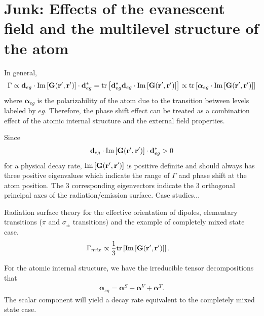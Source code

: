 \documentclass[preprint,aps,pra,onecolumn]{revtex4-1} %
\begin{document}



\section{Junk: Effects of the evanescent field and the multilevel structure of the atom}
In general, 
\begin{align}
\Gamma \propto \mathbf{d}_{eg}\cdot \mathrm{Im}\left[\mathbf{G}(\mathbf{r}',\mathbf{r}') \right]\cdot\mathbf{d}_{eg}^*=\mathrm{tr}\left[\mathbf{d}_{eg}^*\mathbf{d}_{eg}\cdot \mathrm{Im}\left[\mathbf{G}(\mathbf{r}',\mathbf{r}') \right] \right]\propto \mathrm{tr}\left[\boldsymbol{\alpha}_{eg}\cdot \mathrm{Im}\left[\mathbf{G}(\mathbf{r}',\mathbf{r}') \right] \right]
\end{align}
where $ \boldsymbol{\alpha}_{eg} $ is the polarizability of the atom due to the transition between levels labeled by $ eg $. Therefore, the phase shift effect can be treated as a combination effect of the atomic internal structure and the external field properties. 

Since 
\begin{align}
\mathbf{d}_{eg}\cdot \mathrm{Im}\left[\mathbf{G}(\mathbf{r}',\mathbf{r}') \right]\cdot\mathbf{d}_{eg}^*>0
\end{align}
for a physical decay rate, $\mathrm{Im}\left[\mathbf{G}(\mathbf{r}',\mathbf{r}')\right]$ is positive definite and should always has three positive eigenvalues which indicate the range of $ \Gamma $ and phase shift at the atom position. The 3 corresponding eigenvectors indicate the 3 orthogonal principal axes of the radiation/emission surface. Case studies...

Radiation surface theory for the effective orientation of dipoles, elementary transitions ($ \pi $ and $ \sigma_\pm $ transitions) and the example of completely mixed state case. 
\begin{align}
\Gamma_{mix} &\propto \frac{1}{3} \mathrm{tr}\left[ \mathrm{Im}\left[\mathbf{G}(\mathbf{r}',\mathbf{r}')\right] \right].
\end{align}

For the atomic internal structure, we have the irreducible tensor decompositions that 
\begin{align}
\boldsymbol{\alpha}_{eg} = \boldsymbol{\alpha}^S + \boldsymbol{\alpha}^V + \boldsymbol{\alpha}^T.
\end{align}
The scalar component will yield a decay rate equivalent to the completely mixed state case. 
\end{document}
